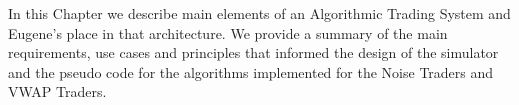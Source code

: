 In this Chapter we describe main elements of an Algorithmic Trading System and Eugene’s place in that architecture. We provide a summary of the main requirements, use cases and principles that informed the design of the simulator and the pseudo code for the algorithms implemented for the Noise Traders and VWAP Traders.